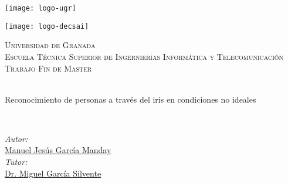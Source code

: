 \documentclass[
11pt, %
spanish, %
doublespacing, %
headsepline, %
]{MastersDoctoralThesis} %
\author{Manuel Jesús García Manday} %
\begin{document}
\frontmatter %

\pagestyle{plain} %


\begin{titlepage}
\begin{center}

\begin{minipage}{0.48\textwidth} \begin{flushleft}
\texttt{[image: logo-ugr]}
\end{flushleft}\end{minipage}
\begin{minipage}{0.48\textwidth} \begin{flushright}
\texttt{[image: logo-decsai]}
\end{flushright}\end{minipage}

\vspace*{.06\textheight}
{\scshape\LARGE Universidad de Granada}\vspace{1.0cm}\\[0.5cm]  %
\textsc{\Large Escuela Técnica Superior de Ingernierías Informática y Telecomunicación}\\[1.0cm] 
\textsc{\Large Trabajo Fin de Master}\\[0.5cm] 

\HRule \\[0.4cm] %
{\huge \bfseries \par Reconocimiento de personas a través del iris en condiciones no ideales} %
\HRule \\[0.4cm] %
 
\begin{minipage}[t]{0.4\textwidth}
\begin{flushleft} \large
\emph{Autor:}\\
\href{}{Manuel Jesús García Manday}\\[0.5cm] %
\emph{Tutor:} \\
\href{}{Dr. Miguel García Silvente} %
\end{flushleft}
\end{minipage}\\[3cm]
 

\end{center}
\end{titlepage}
\end{document}
